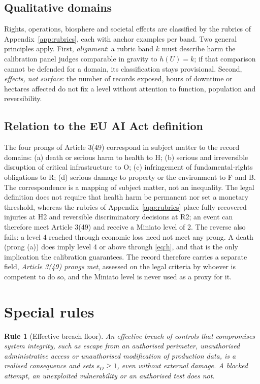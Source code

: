\documentclass[11pt,a4paper]{article}
\newtheorem{rule_}{Rule}
\begin{document}
\subsection{Qualitative domains}

Rights, operations, biosphere and societal effects are classified by the rubrics of Appendix~\ref{app:rubrics}, each with anchor examples per band. Two general principles apply. First, \emph{alignment}: a rubric band $k$ must describe harm the calibration panel judges comparable in gravity to $h(U)=k$; if that comparison cannot be defended for a domain, its classification stays provisional. Second, \emph{effects, not surface}: the number of records exposed, hours of downtime or hectares affected do not fix a level without attention to function, population and reversibility.

\subsection{Relation to the EU AI Act definition}
\label{sec:euact}

The four prongs of Article 3(49) correspond in subject matter to the record domains: (a) death or serious harm to health to H; (b) serious and irreversible disruption of critical infrastructure to O; (c) infringement of fundamental-rights obligations to R; (d) serious damage to property or the environment to F and B. The correspondence is a mapping of subject matter, not an inequality. The legal definition does not require that health harm be permanent nor set a monetary threshold, whereas the rubrics of Appendix~\ref{app:rubrics} place fully recovered injuries at H2 and reversible discriminatory decisions at R2; an event can therefore meet Article 3(49) and receive a Miniato level of 2. The reverse also fails: a level 4 reached through economic loss need not meet any prong. A death (prong (a)) does imply level 4 or above through \eqref{eq:h}, and that is the only implication the calibration guarantees. The record therefore carries a separate field, \emph{Article 3(49) prongs met}, assessed on the legal criteria by whoever is competent to do so, and the Miniato level is never used as a proxy for it.

\section{Special rules}
\label{sec:rules}

\begin{rule_}[Effective breach floor]
An effective breach of controls that compromises system integrity, such as escape from an authorised perimeter, unauthorised administrative access or unauthorised modification of production data, is a realised consequence and sets $s_O \ge 1$, even without external damage. A blocked attempt, an unexploited vulnerability or an authorised test does not.
\end{rule_}
\end{document}
